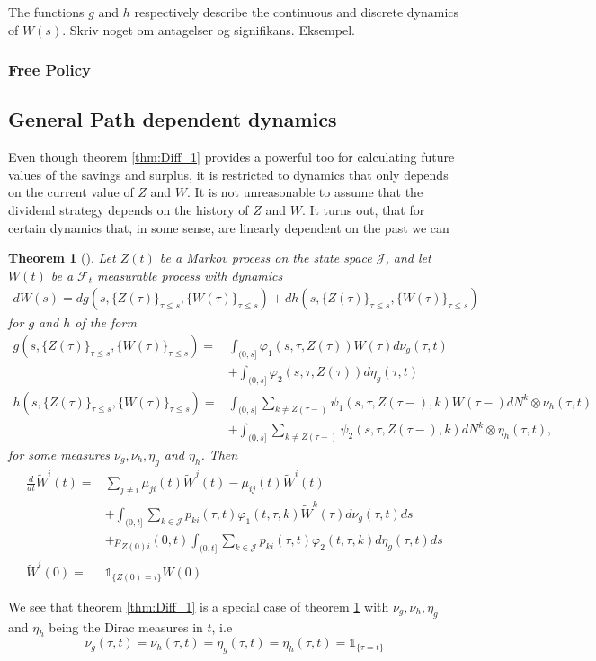 \documentclass[12pt]{article}
\newcommand{\indic}[1]{\mathds{1}_{ \{ #1 \} }}
\theoremstyle{my_thm}
\newtheorem{thm}{Theorem}[section]
\begin{document}
The functions $g$ and $h$ respectively describe the continuous and discrete dynamics of $W(s)$. Skriv noget om antagelser og signifikans. Eksempel.
\subsubsection{Free Policy}

\subsection{General Path dependent dynamics}
Even though theorem \ref{thm:Diff_1} provides a powerful too for calculating future values of the savings and surplus, it is restricted to dynamics that only depends on the current value of $Z$ and $W$. It is not unreasonable to assume that the dividend strategy depends on the history of $Z$ and $W$. It turns out, that for certain dynamics that, in some sense, are linearly dependent on the past we can 


\begin{thm}[]
\label{thm:Diff_2}
Let $Z(t)$ be a Markov process on the state space $\mathcal{J}$, and let $W(t)$ be a $\mathcal{F}_t$ measurable process with dynamics
\begin{align*}
dW(s)= d g(s,\{Z(\tau)\}_{\tau\leq s},\{W(\tau)\}_{\tau\leq s})+
 d h(s,\{Z(\tau)\}_{\tau\leq s},\{W(\tau)\}_{\tau\leq s})
\end{align*}
for $g$ and $h$ of the form
\begin{align*}
g(s,\{Z(\tau)\}_{\tau\leq s},\{W(\tau)\}_{\tau\leq s})=&\int_{(0,s]} \varphi_1(s,\tau,Z(\tau))W(\tau) d\nu_g(\tau,t)
\\
&+
\int_{(0,s]} \varphi_2(s,\tau,Z(\tau)) d\eta_g(\tau,t)
\\
h(s,\{Z(\tau)\}_{\tau\leq s},\{W(\tau)\}_{\tau\leq s})=&\int_{(0,s]} \sum_{k\neq Z(\tau-)} \psi_1(s,\tau,Z(\tau-),k) W(\tau-)  dN^k\otimes\nu_h(\tau,t)
\\
&+
\int_{(0,s]} \sum_{k\neq Z(\tau-)} \psi_2(s,\tau,Z(\tau-),k)  dN^k\otimes\eta_h(\tau,t),
\end{align*}
for some measures $\nu_g,\nu_h,\eta_g$ and $\eta_h$.
Then
\begin{align*}
\frac{d}{dt}\tilde{W}^i(t)=&
\sum_{j \neq i} \mu_{ji}(t) \tilde{W}^j(t)-\mu_{ij}(t)\tilde{W}^i(t)
\\
&+
\int_{(0,t]} \sum_{k \in \mathcal{J}} p_{ki}(\tau,t) \varphi_1(t,\tau,k) \tilde{W}^k(\tau) d\nu_g(\tau,t) ds
\\
&+
p_{Z(0)i}(0,t)\int_{(0,t]} \sum_{k \in \mathcal{J}} p_{ki}(\tau,t) \varphi_2(t,\tau,k) d\eta_g(\tau,t) ds
\\
\tilde{W}^i(0)=&\indic{Z(0)=i}W(0)
\end{align*}

\end{thm}
We see that theorem \ref{thm:Diff_1} is a special case of theorem \ref{thm:Diff_2} with $\nu_g,\nu_h,\eta_g$ and $\eta_h$ being the Dirac measures in $t$, i.e 
$$
\nu_g(\tau,t)=\nu_h(\tau,t)=\eta_g(\tau,t)=\eta_h(\tau,t)=\indic{\tau=t}
$$
\end{document}
